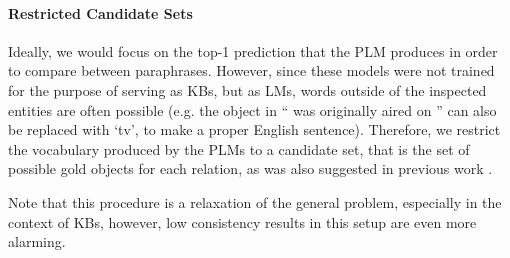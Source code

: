 
\paragraph{Restricted Candidate Sets}
Ideally, we would focus on the top-1 prediction that the PLM produces in order to compare between paraphrases. However, since these models were not trained for the purpose of serving as KBs, but as LMs, words outside of the inspected entities are often possible (e.g. the object in ``\subj{} was originally aired on \obj{}'' can also be replaced with `tv', to make a proper English sentence).
Therefore, we restrict the vocabulary produced by the PLMs to a candidate set, that is the set of possible gold objects for each relation, as was also suggested in previous work \cite{Xiong2020Pretrained, nora@@}.

Note that this procedure is a relaxation of the general problem, especially in the context of KBs, however, low consistency results in this setup are even more alarming. 
